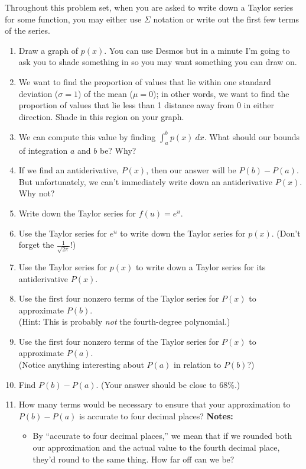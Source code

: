 \documentclass[11pt]{article}
\begin{document}
Throughout this problem set, when you are asked to write down a Taylor series for some function, you may either use $\Sigma$ notation or write out the first few terms of the series.
\begin{enumerate}[leftmargin=0pt]
    \item Draw a graph of $p(x)$. You can use Desmos but in a minute I'm going to ask you to shade something in so you may want something you can draw on.
    \item We want to find the proportion of values that lie within one standard deviation ($\sigma = 1$) of the mean ($\mu=0$); in other words, we want to find the proportion of values that lie less than 1 distance away from 0 in either direction. Shade in this region on your graph.
    \item We can compute this value by finding $\int_a^b p(x)\ dx$. What should our bounds of integration $a$ and $b$ be? Why?
    \item If we find an antiderivative, $P(x)$, then our answer will be $P(b) - P(a)$. But unfortunately, we can't immediately write down an antiderivative $P(x)$. Why not?
    \item Write down the Taylor series for $f(u) = e^u$.
    \item Use the Taylor series for $e^u$ to write down the Taylor series for $p(x).$  (Don't forget the $\tfrac{1}{\sqrt{2\pi}}$!)
    \item Use the Taylor series for $p(x)$ to write down a Taylor series for its antiderivative $P(x)$.
    \item Use the first four nonzero terms of the Taylor series for $P(x)$ to approximate $P(b)$. \\
    (Hint: This is probably \textit{not} the fourth-degree polynomial.)
    \item Use the first four nonzero terms of the Taylor series for $P(x)$ to approximate $P(a)$. \\
    (Notice anything interesting about $P(a)$ in relation to $P(b)$?)
    \item Find $P(b) - P(a)$. (Your answer should be close to 68\%.)
    \item How many terms would be necessary to ensure that your approximation to $P(b)-P(a)$ is accurate to four decimal places? \textbf{Notes:}
    \begin{itemize}
        \item By ``accurate to four decimal places,'' we mean that if we rounded both our approximation and the actual value to the fourth decimal place, they'd round to the same thing. How far off can we be?

\end{itemize}
\end{enumerate}
\end{document}
